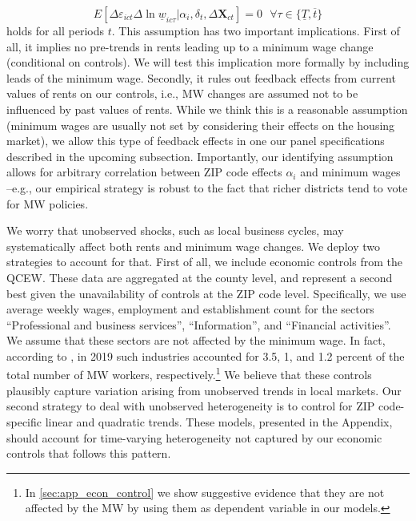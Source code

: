 \begin{equation*}
	E[\Delta \varepsilon_{ict} \Delta \ln \underline{w}_{ic\tau}  
							| \alpha_i, \delta_t, \Delta \mathbf{X}_{ct}] = 0
	\ \ \ \forall \tau \in \{\underline{T}, \overline{t} \}
\end{equation*}
holds for all periods $t$. This assumption has two important implications. First of all, 
it implies no pre-trends in rents leading up to a minimum wage change (conditional on 
controls). We will test this implication more formally by including leads of the minimum 
wage. Secondly, it rules out feedback effects from current values of rents on our controls, 
i.e., MW changes are assumed not to be influenced by past values of rents. While we think 
this is a reasonable assumption (minimum wages are usually not set by considering their 
effects on the housing market), we allow this type of feedback effects in one our panel 
specifications described in the upcoming subsection. Importantly, our identifying assumption 
allows for arbitrary correlation between ZIP code effects $\alpha_i$ and minimum wages 
--e.g., our empirical strategy is robust to the fact that richer districts tend to vote 
for MW policies.


We worry that unobserved shocks, such as local business cycles, may systematically affect 
both rents and minimum wage changes. We deploy two strategies to account for that. First 
of all, we include economic controls from the QCEW. 
These data are aggregated at the county level, and represent a second best given the 
unavailability of controls at the ZIP code level. Specifically, we use average weekly wages, 
employment and establishment count for the sectors ``Professional and business services'', 
``Information'', and ``Financial activities''. We assume that these sectors are not affected 
by the minimum wage. In fact, according to \textcite[][table 5]{MinWorkersReportBLS}, in 2019 
such industries accounted for 3.5, 1, and 1.2 percent of the total number of MW workers, 
respectively.\footnote{In \autoref{sec:app_econ_control} we show suggestive evidence 
	that they are not affected by the MW by using them as dependent variable in our models.}
We believe that these controls plausibly capture variation arising from unobserved trends 
in local markets. Our second strategy to deal with unobserved heterogeneity is to control for
ZIP code-specific linear and quadratic trends. These models, presented in the Appendix, 
should account for time-varying heterogeneity not captured by our economic controls that 
follows this pattern.

